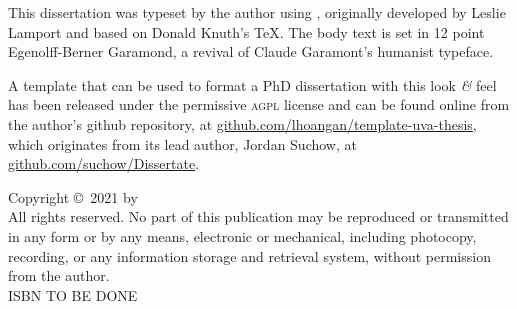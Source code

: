    \noindent This dissertation was typeset by the author using \LaTeXe,
   originally developed by Leslie Lamport and based on Donald Knuth's \TeX.
   The body text is set in 12 point Egenolff-Berner Garamond,
   a revival of Claude Garamont's humanist typeface.
   
   A template that can be used to format a PhD dissertation with this look
   \textit{\&} feel has been released under the permissive \textsc{agpl}
   license and can be found online from the author's github repository, at
   \href{https://github.com/lhoangan/template-uva-thesis}{github.com/lhoangan/template-uva-thesis},
   which originates from its lead author, Jordan Suchow, at
   \href{https://github.com/suchow/Dissertate}{github.com/suchow/Dissertate}.
   
\vspace*{\fill}

{
    \noindent Copyright \small \copyright\ \small 2021 \hspace{3pt} by \theauthor \\
    \noindent All rights reserved. No part of this publication may be reproduced or transmitted in any form or by any means, electronic or mechanical, including photocopy, recording, or any information storage and retrieval system, without permission from the author. \\
    \noindent ISBN {\color{red}TO BE DONE}
}